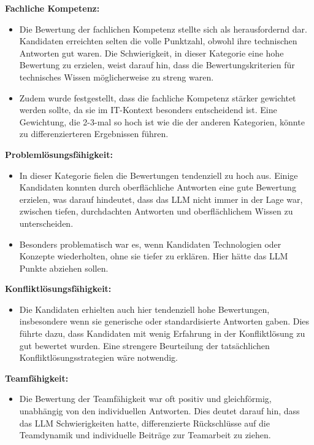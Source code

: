 \textbf{Fachliche Kompetenz:}

\begin{itemize}
    \item Die Bewertung der fachlichen Kompetenz stellte sich als herausfordernd dar. Kandidaten erreichten selten die volle Punktzahl, obwohl ihre technischen Antworten gut waren. Die Schwierigkeit, in dieser Kategorie eine hohe Bewertung zu erzielen, weist darauf hin, dass die Bewertungskriterien für technisches Wissen möglicherweise zu streng waren.
    \item Zudem wurde festgestellt, dass die fachliche Kompetenz stärker gewichtet werden sollte, da sie im IT-Kontext besonders entscheidend ist. Eine Gewichtung, die 2-3-mal so hoch ist wie die der anderen Kategorien, könnte zu differenzierteren Ergebnissen führen.
\end{itemize}

\textbf{Problemlösungsfähigkeit:}

\begin{itemize}
    \item In dieser Kategorie fielen die Bewertungen tendenziell zu hoch aus. Einige Kandidaten konnten durch oberflächliche Antworten eine gute Bewertung erzielen, was darauf hindeutet, dass das \acs{LLM} nicht immer in der Lage war, zwischen tiefen, durchdachten Antworten und oberflächlichem Wissen zu unterscheiden.
    \item Besonders problematisch war es, wenn Kandidaten Technologien oder Konzepte wiederholten, ohne sie tiefer zu erklären. Hier hätte das \acs{LLM} Punkte abziehen sollen.
\end{itemize}

\textbf{Konfliktlösungsfähigkeit:}

\begin{itemize}
    \item Die Kandidaten erhielten auch hier tendenziell hohe Bewertungen, insbesondere wenn sie generische oder standardisierte Antworten gaben. Dies führte dazu, dass Kandidaten mit wenig Erfahrung in der Konfliktlösung zu gut bewertet wurden. Eine strengere Beurteilung der tatsächlichen Konfliktlösungsstrategien wäre notwendig.
\end{itemize}

\textbf{Teamfähigkeit:}

\begin{itemize}
    \item Die Bewertung der Teamfähigkeit war oft positiv und gleichförmig, unabhängig von den individuellen Antworten. Dies deutet darauf hin, dass das \acs{LLM} Schwierigkeiten hatte, differenzierte Rückschlüsse auf die Teamdynamik und individuelle Beiträge zur Teamarbeit zu ziehen.
\end{itemize}

